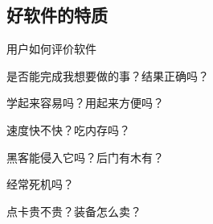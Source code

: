 \documentclass[]{beamer}
\begin{document}
\subsection{好软件的特质}

\begin{frame}{用户如何评价软件}
  \begin{description}[正确性]
    \item[正确性] 是否能完成我想要做的事？结果正确吗？
      \pause
    \item[易用性] 学起来容易吗？用起来方便吗？
      \pause
    \item[性能] 速度快不快？吃内存吗？
      \pause
    \item[安全性] 黑客能侵入它吗？后门有木有？
      \pause
    \item[稳定性] 经常死机吗？
      \pause
    \item[成本] 点卡贵不贵？装备怎么卖？
  \end{description}
\end{frame}
\end{document}
